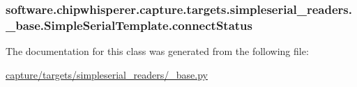 \subsubsection[{connect\+Status}]{\setlength{\rightskip}{0pt plus 5cm}software.\+chipwhisperer.\+capture.\+targets.\+simpleserial\+\_\+readers.\+\_\+base.\+Simple\+Serial\+Template.\+connect\+Status}\label{classsoftware_1_1chipwhisperer_1_1capture_1_1targets_1_1simpleserial__readers_1_1__base_1_1SimpleSerialTemplate_ad3d47613cabb8286d1c435703050daa8}


The documentation for this class was generated from the following file\+:\begin{DoxyCompactItemize}
\item 
\hyperlink{capture_2targets_2simpleserial__readers_2__base_8py}{capture/targets/simpleserial\+\_\+readers/\+\_\+base.\+py}\end{DoxyCompactItemize}
